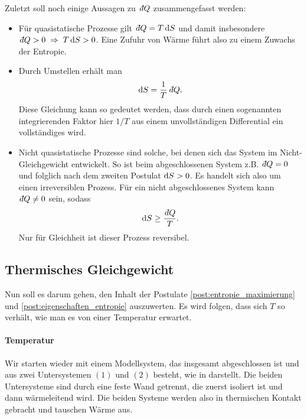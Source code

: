Zuletzt soll noch einige Aussagen zu $\udiff Q$ zusammengefasst werden:
\begin{itemize}
    \item Für quasistatische Prozesse gilt $\udiff Q=T\diff S$ und damit insbesondere $\udiff Q>0\implication T\diff S>0$. Eine Zufuhr von Wärme führt also zu einem Zuwachs der Entropie.
    \item Durch Umstellen erhält man
          \begin{align*}
              \diff S = \frac{1}{T}\udiff Q.
          \end{align*}
          Diese Gleichung kann so gedeutet werden, dass durch einen sogenannten integrierenden Faktor \textendash{} hier $1/T$ \textendash{} aus einem unvollständigen Differential ein vollständiges wird.
    \item Nicht quasistatische Prozesse sind solche, bei denen sich das System im Nicht-Gleichgewicht entwickelt. So ist beim abgeschlossenen System z.B. $\udiff Q=0$ und folglich nach dem zweiten Postulat $\mathop{}\!\mathrm{d} S >0$. Es handelt sich also um einen irreversiblen Prozess. Für ein nicht abgeschlossenes System kann $\udiff Q\neq 0$ sein, sodass
          \begin{align*}
              \diff S\geq \frac{\udiff Q}{T}.
          \end{align*}
          Nur für Gleichheit ist dieser Prozess reversibel.
\end{itemize}










\subsection{Thermisches Gleichgewicht\label{sec:thermisches_gleichgewicht}}

Nun soll es darum gehen, den Inhalt der Postulate \ref{post:entropie_maximierung} und \ref{post:eigenschaften_entropie} auszuwerten.
Es wird folgen, dass sich $T$ so verhält, wie man es von einer Temperatur erwartet.

\paragraph*{Temperatur}

Wir starten wieder mit einem Modellsystem, das insgesamt abgeschlossen ist und aus zwei Untersystemen $(1)$ und $(2)$ besteht, wie in  darstellt.
Die beiden Untersysteme sind durch eine feste Wand getrennt, die zuerst isoliert ist und dann wärmeleitend wird. Die beiden Systeme werden also in thermischen Kontakt gebracht und tauschen Wärme aus.

